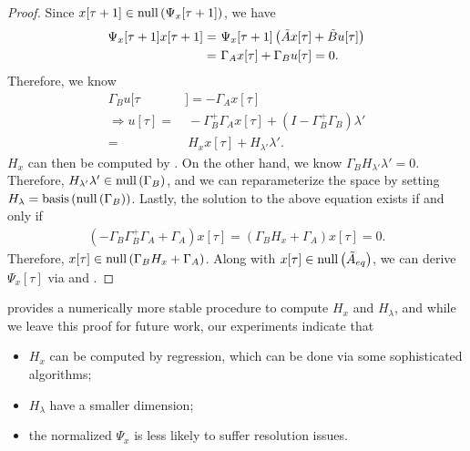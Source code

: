 \begin{proof}
Since $x[\tau+1] \in \text{\rm null}\left(\Psi_x[\tau+1]\right)$, we have
\begin{align*}
\Psi_x[\tau+1] x[\tau+1] =&\
\Psi_x[\tau+1] \left(\tilde{A} x[\tau] + \tilde{B} u[\tau] \right) \\
=&\ \Gamma_A x[\tau] + \Gamma_B u[\tau] = 0.
\end{align*}
Therefore, we know 
\begin{align*}
 \Gamma_B u[\tau&] = - \Gamma_A x[\tau]\\
\Rightarrow u[\tau] =&\ - \Gamma_B^+ \Gamma_A x[\tau] + (I - \Gamma_B^+ \Gamma_B) \lambda'\\
=&\ H_x x[\tau] + H_{\lambda'} \lambda'.
\end{align*}
$H_x$ can then be computed by . On the other hand, we know $\Gamma_B H_{\lambda'} \lambda' = 0$. Therefore, $H_{\lambda'} \lambda' \in \text{\rm null}\left(\Gamma_B\right)$, and we can reparameterize the space by setting $H_\lambda = \text{\rm basis}\left(\text{\rm null}\left(\Gamma_B\right)\right)$. Lastly, the solution to the above equation exists if and only if
\begin{align*}
(- \Gamma_B \Gamma_B^+ \Gamma_A + \Gamma_A) x[\tau] = (\Gamma_B H_x + \Gamma_A) x[\tau] = 0.
\end{align*}
Therefore, $x[\tau] \in \text{\rm null}\left(\Gamma_B H_x + \Gamma_A\right)$. Along with $x[\tau] \in \text{\rm null}\left(\tilde{A}_{eq}\right)$, we can derive $\Psi_x[\tau]$ via  and .
\end{proof}

 provides a numerically more stable procedure to compute $H_x$ and $H_\lambda$, and while we leave this proof for future work, our experiments indicate that
\begin{itemize}
\item $H_x$ can be computed by regression, which can be done via some sophisticated algorithms;
\item $H_\lambda$ have a smaller dimension;
\item the normalized $\Psi_x$ is less likely to suffer resolution issues. 
\end{itemize}


